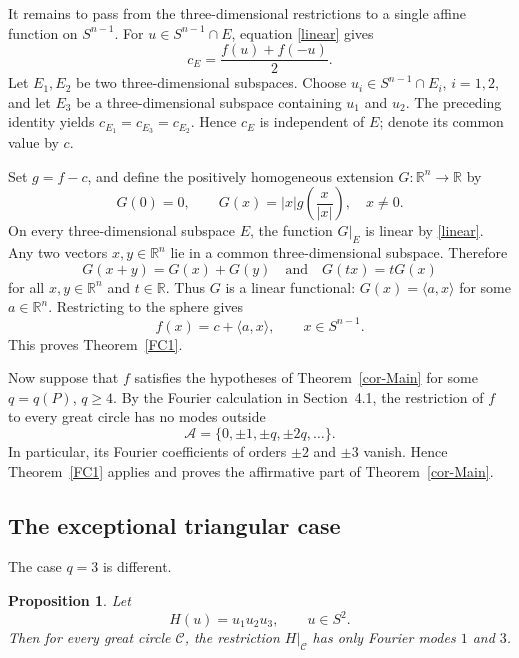 \documentclass[11pt]{article}
\newtheorem{proposition}[theorem]{Proposition}
\theoremstyle{definition}
\begin{document}
It remains to pass from the three-dimensional restrictions to a single affine function
on \(S^{n-1}\). For \(u\in S^{n-1}\cap E\), equation \eqref{linear} gives
\[
c_E=\frac{f(u)+f(-u)}2.
\]
Let \(E_1,E_2\) be two three-dimensional subspaces. Choose
\(u_i\in S^{n-1}\cap E_i\), \(i=1,2\), and let \(E_3\) be a three-dimensional
subspace containing \(u_1\) and \(u_2\). The preceding identity yields
\(c_{E_1}=c_{E_3}=c_{E_2}\). Hence \(c_E\) is independent of \(E\); denote its
common value by \(c\).

Set \(g=f-c\), and define the positively homogeneous extension \(G:\mathbb R^n\to
\mathbb R\) by
\[
G(0)=0,
\qquad
G(x)=|x|g\!\left(\frac{x}{|x|}\right),\quad x\ne0.
\]
On every three-dimensional subspace \(E\), the function \(G|_E\) is linear by
\eqref{linear}. Any two vectors \(x,y\in\mathbb R^n\) lie in a common
three-dimensional subspace. Therefore
\[
G(x+y)=G(x)+G(y)
\quad\text{and}\quad
G(tx)=tG(x)
\]
for all \(x,y\in\mathbb R^n\) and \(t\in\mathbb R\). Thus \(G\) is a linear
functional: \(G(x)=\langle a,x\rangle\) for some \(a\in\mathbb R^n\). Restricting to
the sphere gives
\[
f(x)=c+\langle a,x\rangle,
\qquad x\in S^{n-1}.
\]
This proves Theorem~\ref{FC1}.

Now suppose that \(f\) satisfies the hypotheses of Theorem~\ref{cor-Main} for some $q=q(P)$,
\(q\ge4\). By the Fourier calculation in Section~4.1, the restriction of \(f\) to every
great circle has no modes outside
\[
\mathcal A=\{0,\pm1,\pm q,\pm2q,\ldots\}.
\]
In particular, its Fourier coefficients of orders \(\pm2\) and \(\pm3\) vanish. Hence
Theorem~\ref{FC1} applies and proves the affirmative part of
Theorem~\ref{cor-Main}.

\subsection{The exceptional triangular case}

The case \(q=3\) is different.

\begin{proposition}\label{prop:cubic}
Let
\[
H(u)=u_1u_2u_3,\qquad u\in S^2.
\]
Then for every great circle \({\mathcal C}\), the restriction \(H|_{\mathcal C}\) has only Fourier modes \(1\)
and \(3\).
\end{proposition}
\end{document}
